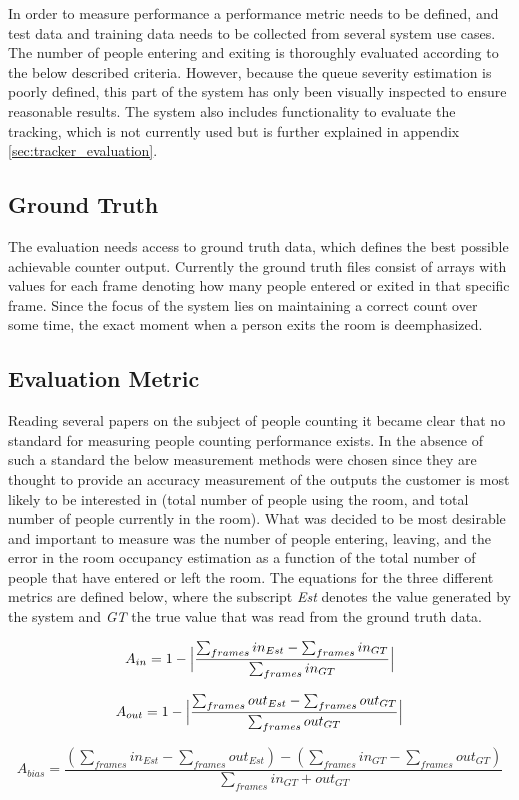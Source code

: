 In order to measure performance a performance metric needs to be defined, and test data and training data needs to be collected from several system use cases. The number of people entering and exiting is thoroughly evaluated according to the below described criteria. However, because the queue severity estimation is poorly defined, this part of the system has only been visually inspected to ensure reasonable results. The system also includes functionality to evaluate the tracking, which is not currently used but is further explained in appendix \ref{sec:tracker_evaluation}.

\subsection{Ground Truth}
The evaluation needs access to ground truth data, which defines the best possible achievable counter output. Currently the ground truth files consist of arrays with values for each frame denoting how many people entered or exited in that specific frame. Since the focus of the system lies on maintaining a correct count over some time, the exact moment when a person exits the room is deemphasized.

\subsection{Evaluation Metric}
Reading several papers on the subject of people counting it became clear that no standard for measuring people counting performance exists. In the absence of such a standard the below measurement methods were chosen since they are thought to provide an accuracy measurement of the outputs the customer is most likely to be interested in (total number of people using the room, and total number of people currently in the room).
What was decided to be most desirable and important to measure was the number of people entering, leaving, and the error in the room occupancy estimation as a function of the total number of people that have entered or left the room. The equations for the three different metrics are defined below, where the subscript \textit{Est} denotes the value generated by the system and \textit{GT} the true value that was read from the ground truth data.

\begin{equation}
\label{eq:in_accuracy}
A_{in} = 1 - \Big{\lvert}\frac{\sum_{frames}{in_{Est}}-\sum_{frames}{in_{GT}}}{\sum_{frames}in_{GT}}\Big{\rvert}
\end{equation} 

\begin{equation}
\label{eq:out_accuracy}
A_{out} = 1 - \Big{\lvert}\frac{\sum_{frames}{out_{Est}}-\sum_{frames}out_{GT}}{\sum_{frames}out_{GT}}\Big{\rvert} 
\end{equation} 

\begin{equation}
\label{eq:occupancy_bias}
A_{bias} = \frac{(\sum_{frames}{in_{Est}-\sum_{frames}out_{Est}})-(\sum_{frames}{in_{GT}-\sum_{frames}out_{GT}})}{\sum_{frames}in_{GT}+out_{GT}} 
\end{equation} 




